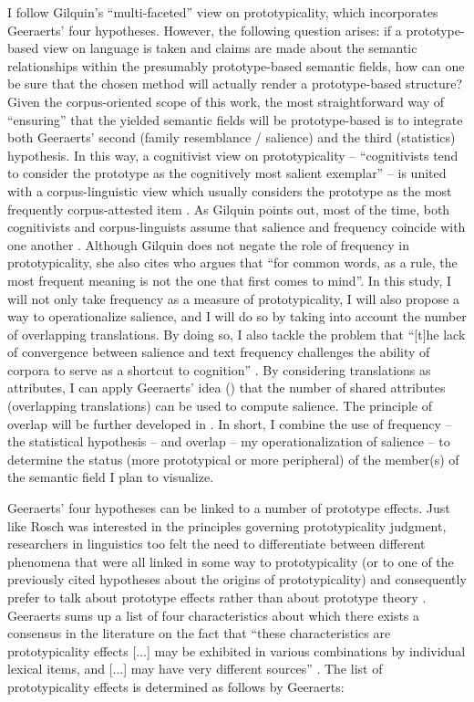 I follow Gilquin’s “multi-faceted” view on prototypicality, which incorporates Geeraerts' four hypotheses. However, the following question arises: if a prototype-based view on language is taken and claims are made about the semantic relationships within the presumably prototype-based semantic fields, how can one be sure that the chosen method will actually render a prototype-based structure? Given the corpus-oriented scope of this work, the most straightforward way of ``ensuring'' that the yielded semantic fields will be prototype-based is to integrate both Geeraerts’ second (family resemblance / salience) and the third (statistics) hypothesis. In this way, a cognitivist view on prototypicality – “cognitivists tend to consider the prototype as the cognitively most salient exemplar” \citep[159]{gilquin_place_2006} – is united with a corpus-linguistic view which usually considers the prototype as the most frequently corpus-attested item \citep{gilquin_place_2006}. As Gilquin points out, most of the time, both cognitivists and corpus-linguists assume that salience and frequency coincide with one another \citep{gilquin_place_2006}. Although Gilquin does not negate the role of frequency in prototypicality, she also cites \citet[36]{sinclair_corpus_1991} who argues that “for common words, as a rule, the most frequent meaning is not the one that first comes to mind”. In this study, I will not only take frequency as a measure of prototypicality, I will also propose a way to operationalize salience, and I will do so by taking into account the number of overlapping translations. By doing so, I also tackle the problem that “[t]he lack of convergence between salience and text frequency challenges the ability of corpora to serve as a shortcut to cognition” \citep[9]{arppe_cognitive_2010}. By considering translations as attributes, I can apply Geeraerts' idea (\citeyear[29]{geeraerts_where_2006}) that the number of shared attributes (overlapping translations) can be used to compute salience. The principle of overlap will be further developed in . In short, I combine the use of frequency – the statistical hypothesis – and overlap – my operationalization of salience – to determine the status (more prototypical or more peripheral) of the member(s) of the semantic field I plan to visualize.

Geeraerts’ four hypotheses can be linked to a number of prototype effects. Just like Rosch was interested in the principles governing prototypicality judgment, researchers in linguistics too felt the need to differentiate between different phenomena that were all linked in some way to prototypicality (or to one of the previously cited hypotheses about the origins of prototypicality) and consequently prefer to talk about prototype effects rather than about prototype theory \citep[578]{allan_lexical_2013}. Geeraerts sums up a list of four characteristics about which there exists a consensus in the literature on the fact that “these characteristics are prototypicality effects [...] may be exhibited in various combinations by individual lexical items, and [...] may have very different sources” \citep[578]{allan_lexical_2013}. The list of prototypicality effects is determined as follows by Geeraerts:

